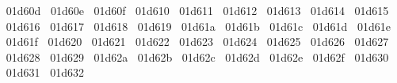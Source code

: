 {  ^^^^^^01d60d%
  ^^^^^^01d60e%
  ^^^^^^01d60f%
  ^^^^^^01d610%
  ^^^^^^01d611%
  ^^^^^^01d612%
  ^^^^^^01d613%
  ^^^^^^01d614%
  ^^^^^^01d615%
  ^^^^^^01d616%
  ^^^^^^01d617%
  ^^^^^^01d618%
  ^^^^^^01d619%
  ^^^^^^01d61a%
  ^^^^^^01d61b%
  ^^^^^^01d61c%
  ^^^^^^01d61d%
  ^^^^^^01d61e%
  ^^^^^^01d61f%
  ^^^^^^01d620%
  ^^^^^^01d621%
  ^^^^^^01d622%
  ^^^^^^01d623%
  ^^^^^^01d624%
  ^^^^^^01d625%
  ^^^^^^01d626%
  ^^^^^^01d627%
  ^^^^^^01d628%
  ^^^^^^01d629%
  ^^^^^^01d62a%
  ^^^^^^01d62b%
  ^^^^^^01d62c%
  ^^^^^^01d62d%
  ^^^^^^01d62e%
  ^^^^^^01d62f%
  ^^^^^^01d630%
  ^^^^^^01d631%
  ^^^^^^01d632%
}
